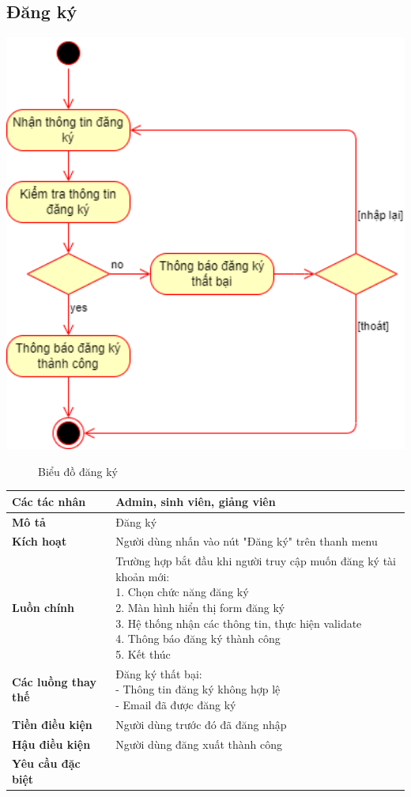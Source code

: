 \subsection{Đăng ký}
  \begin{center}
    \includegraphics[width=1.1\textwidth]{../drawio/activity/logup.png}
    \begin{figure}[h]
      \centering
      \caption{Biểu đồ đăng ký}
    \end{figure}
  \end{center}
  \begin{tabular}{|l|l|}
    \hline
    \textbf{Các tác nhân} & Admin, sinh viên, giảng viên \\
    \hline
    \textbf{Mô tả} & Đăng ký\\
    \hline
    \textbf{Kích hoạt} & Người dùng nhấn vào nút "Đăng ký" trên thanh menu \\
    \hline 
    \textbf{Luồn chính} & \makecell[l]{Trường hợp bắt đầu khi người truy cập muốn đăng ký tài khoản mới: \\ 1. Chọn chức năng đăng ký \\ 2. Màn hình hiển thị form đăng ký \\ 3. Hệ thống nhận các thông tin, thực hiện validate \\ 4. Thông báo đăng ký thành công \\ 5. Kết thúc} \\
    \hline
    \textbf{Các luồng thay thế} & \makecell[l]{Đăng ký thất bại: \\ - Thông tin đăng ký không hợp lệ \\ - Email đã được đăng ký} \\
    \hline
    \textbf{Tiền điều kiện} & Người dùng trước đó đã đăng nhập \\
    \hline
    \textbf{Hậu điều kiện} & Người dùng đăng xuất thành công \\
    \hline
    \textbf{Yêu cầu đặc biệt} & \\
    \hline
  \end{tabular}

